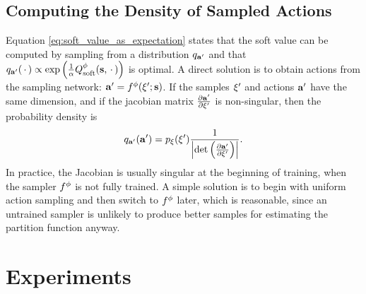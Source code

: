 \subsection{Computing the Density of Sampled Actions}
Equation \autoref{eq:soft_value_as_expectation} states that the soft value can be computed by sampling from a distribution $q_{\mathbf{a}'}$ and that $q_{\mathbf{a}'}(\,\cdot\,) \propto \exp\left(\frac{1}{\alpha}Q_\mathrm{soft}^{\phi}(\mathbf{s}, \,\cdot\,)\right)$ is optimal. A direct solution is to obtain actions from the sampling network: $\mathbf{a}' = f^{\phi}(\mathbf{\xi}'; \mathbf{s})$. If the samples $\mathbf{\xi}'$ and actions $\mathbf{a}'$ have the same dimension, and if the jacobian matrix $\frac{\partial \mathbf{a}'}{\partial \mathbf{\xi}'}$ is non-singular, then the probability density is
\begin{equation}
q_{\mathbf{a}'}(\mathbf{a}') = p_{\mathbf{\xi}}(\mathbf{\xi}') \frac{1}{\left| \text{det}\left( \frac{\partial \mathbf{a}'}{\partial \mathbf{\xi}'} \right)\right|}.
\end{equation}
In practice, the Jacobian is usually singular at the beginning of training, when the sampler $f^{\phi}$ is not fully trained. A simple solution is to begin with uniform action sampling and then switch to $f^{\phi}$ later, which is reasonable, since an untrained sampler is unlikely to produce better samples for estimating the partition function anyway.





\section{Experiments}
\label{app:experiments}

